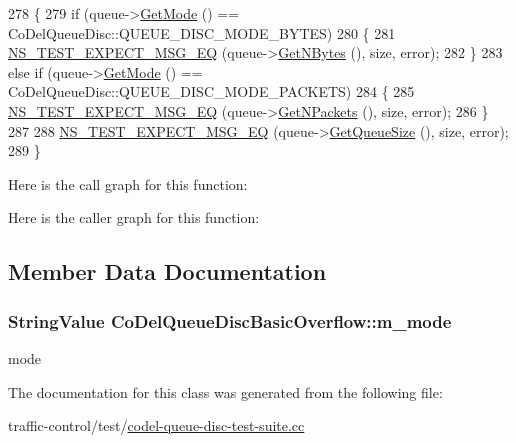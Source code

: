 \begin{DoxyCode}
278   \{
279     \textcolor{keywordflow}{if} (queue->\hyperlink{classns3_1_1CoDelQueueDisc_ab4e1b3733d0961c823b6fa7d2e36c0bb}{GetMode} () == CoDelQueueDisc::QUEUE\_DISC\_MODE\_BYTES)
280       \{
281         \hyperlink{group__testing_ga7304ba46a28d8cf08dfdfd6499cf7068}{NS\_TEST\_EXPECT\_MSG\_EQ} (queue->\hyperlink{classns3_1_1QueueDisc_ac87d3bbf7381d64808f6764bdfd812e5}{GetNBytes} (), size, error);
282       \}
283     \textcolor{keywordflow}{else} \textcolor{keywordflow}{if} (queue->\hyperlink{classns3_1_1CoDelQueueDisc_ab4e1b3733d0961c823b6fa7d2e36c0bb}{GetMode} () == CoDelQueueDisc::QUEUE\_DISC\_MODE\_PACKETS)
284       \{
285         \hyperlink{group__testing_ga7304ba46a28d8cf08dfdfd6499cf7068}{NS\_TEST\_EXPECT\_MSG\_EQ} (queue->\hyperlink{classns3_1_1QueueDisc_a6ee992f32c1671512f0948fd6cc46a7e}{GetNPackets} (), size, error);
286       \}
287 
288     \hyperlink{group__testing_ga7304ba46a28d8cf08dfdfd6499cf7068}{NS\_TEST\_EXPECT\_MSG\_EQ} (queue->\hyperlink{classns3_1_1CoDelQueueDisc_a2eed623615f381b9c377ed7add064953}{GetQueueSize} (), size, error);
289   \}
\end{DoxyCode}


Here is the call graph for this function\+:




Here is the caller graph for this function\+:




\subsection{Member Data Documentation}
\subsubsection[{\texorpdfstring{m\+\_\+mode}{m_mode}}]{\setlength{\rightskip}{0pt plus 5cm}String\+Value Co\+Del\+Queue\+Disc\+Basic\+Overflow\+::m\+\_\+mode\hspace{0.3cm}{\ttfamily [private]}}\hypertarget{classCoDelQueueDiscBasicOverflow_a8300058029d180f082de23dbde5b1ba0}{}\label{classCoDelQueueDiscBasicOverflow_a8300058029d180f082de23dbde5b1ba0}


mode 



The documentation for this class was generated from the following file\+:\begin{DoxyCompactItemize}
\item 
traffic-\/control/test/\hyperlink{codel-queue-disc-test-suite_8cc}{codel-\/queue-\/disc-\/test-\/suite.\+cc}\end{DoxyCompactItemize}

